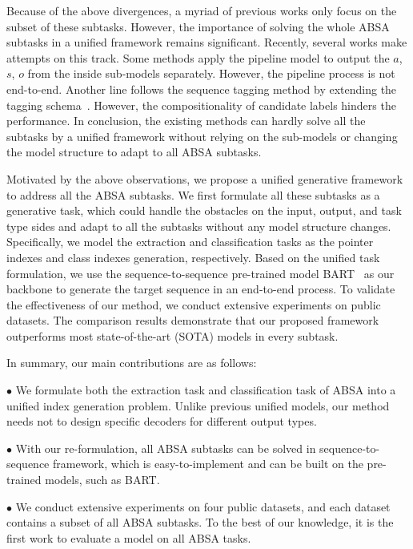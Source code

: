 \documentclass[11pt,a4paper]{article}
\begin{document}
Because of the above divergences, a myriad of previous  works only focus on the subset of these subtasks. However, the importance of solving the whole ABSA subtasks in a unified framework remains significant. Recently, several works make attempts on this track.  Some methods\citep{DBLP:conf/aaai/PengXBHLS20,DBLP:journals/corr/abs-2101-00816} apply the pipeline model to output the $a$, $s$, $o$ from the inside sub-models separately. However, the pipeline process is  not end-to-end. Another line follows the sequence tagging method by extending the tagging schema~\citep{DBLP:conf/emnlp/XuLLB20}. However, the  compositionality of candidate labels hinders the performance. In conclusion, the existing methods can hardly solve all the subtasks by a unified framework  without relying on the sub-models or changing the model structure  to adapt to all ABSA subtasks.

Motivated by the above observations, we propose a unified generative framework to address all the ABSA subtasks. We first formulate all these subtasks as a  generative task, which could handle the obstacles on the input, output, and task type sides and adapt to all the subtasks without any model structure changes. Specifically, we model the extraction and classification tasks as the pointer indexes and class indexes generation, respectively.
Based on the unified task formulation, we use the sequence-to-sequence pre-trained model BART~\citep{DBLP:conf/acl/LewisLGGMLSZ20} as our backbone to generate the target sequence in an end-to-end process.  To validate the effectiveness of our method, we conduct extensive experiments on public datasets. The comparison results demonstrate that our proposed framework outperforms most state-of-the-art (SOTA) models in every subtask.

In summary, our main contributions are as follows:

$\bullet$ We formulate both the extraction task and classification task of ABSA into a unified index generation problem. Unlike previous unified models, our method needs not to design specific decoders for different output types.

$\bullet$ With our re-formulation, all ABSA subtasks can be solved in sequence-to-sequence framework, which is easy-to-implement and can be built on the pre-trained models, such as BART.

$\bullet$ We conduct extensive experiments on  four public datasets, and each dataset contains a subset of all ABSA subtasks. To the best of our knowledge, it is the first work to evaluate a model on all ABSA tasks.
\end{document}
